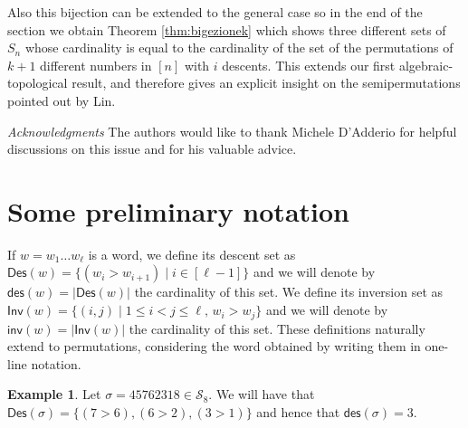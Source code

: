 \documentclass[a4paper]{amsart}
\newcommand{\inv}{\mathsf{inv}}
\newcommand{\Inv}{\mathsf{Inv}}
\newcommand{\Des}{\mathsf{Des}}
\newcommand{\des}{\mathsf{des}}
\newcommand{\single}{\mathsf{single}}
\theoremstyle{definition}
\newtheorem{example}[theorem]{Example}
\theoremstyle{remark}
\numberwithin{equation}{section}
\begin{document}
  Also this bijection can be extended to the general case so in the end of the section  we obtain  Theorem \ref{thm:bigezionek} which shows three different sets of \(S_n\) whose cardinality is equal to the cardinality of the set of the permutations of $k+1$ different numbers in $[n]$ with $i$ descents. This extends our first algebraic-topological result, and therefore gives an explicit insight on the semipermutations pointed out by Lin.
  
  {\em Acknowledgments} The authors would like to thank Michele D’Adderio for helpful discussions on this issue and for his valuable advice.

\section{Some preliminary notation}
\label{secpreliminary}
If $w=w_1\dots w_{\ell}$ is a word, we define its descent set as $\Des(w)=\{(w_i>w_{i+1})\mid i\in[\ell-1]\}$ and we will denote by $\des(w)=|\Des(w)|$ the cardinality of this set. We define its inversion set as $\Inv(w)=\{(i,j)\mid1\leq i<j\leq\ell,\, w_i>w_j\}$ and we will denote by $\inv(w)=|\Inv(w)|$ the cardinality of this set. These definitions naturally extend to permutations, considering the word obtained by writing them in one-line notation.

\begin{example}\label{ex_sigma}
Let $\sigma=45762318\in \mathcal{S}_8$. We will have that $\Des(\sigma)=\{(7>6),(6>2),(3>1)\}$ and hence that $\des(\sigma)=3$.
\end{example}

\end{document}
